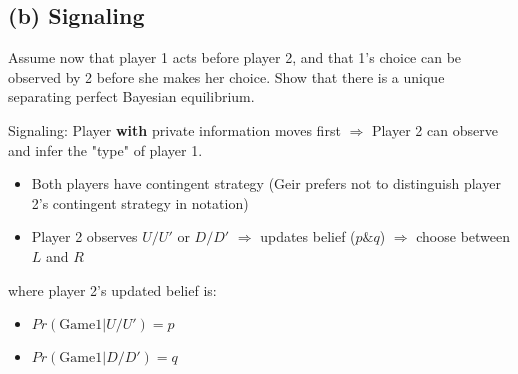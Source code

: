 \documentclass{article}
\begin{document}
\subsection*{(b) Signaling} Assume now that player 1 acts before player 2, and that 1's choice can be observed by 2 before she makes her choice. Show that there is a unique separating perfect Bayesian equilibrium.

\bigskip

\begin{mdframed}[backgroundcolor=blue!20,linecolor=white]
Signaling: Player \textbf{with} private information moves first $\Rightarrow$ 
Player 2 can observe and infer the "type" of player 1.

\begin{itemize}
\item Both players have contingent strategy (Geir prefers not to distinguish player 2's contingent strategy in notation)
\item Player 2 observes $U/U'$ or $D/D'$ $\Rightarrow$ updates belief ($p\&q$) $\Rightarrow$ choose between $L$ and $R$
\end{itemize}

 where player 2's updated belief is:
\begin{itemize}
\item $Pr(\text{Game1} | U/U') = p$
\item $Pr(\text{Game1} | D/D') = q$
\end{itemize}




\end{mdframed}
\end{document}
